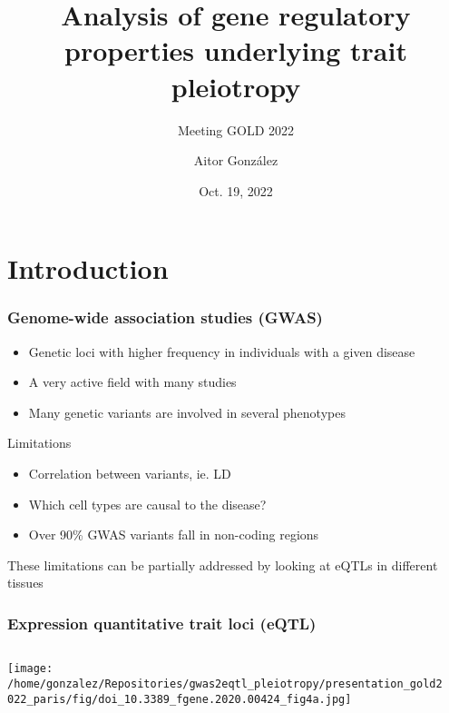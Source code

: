 \documentclass{beamer}
\title{Analysis of gene regulatory properties underlying trait pleiotropy}
\subtitle{Meeting GOLD 2022}
\author{Aitor Gonz\'alez}
\institute{Aix Marseille Univ, INSERM, TAGC}
\date{Oct. 19, 2022}
\begin{document}
\begin{frame}

\titlepage

\end{frame}


\section{Introduction} %

\begin{frame}
\frametitle{Genome-wide association studies (GWAS)}

\begin{itemize}
\item Genetic loci with higher frequency in individuals with a given disease
\item A very active field with many studies
\item Many genetic variants are involved in several phenotypes
\end{itemize}
%
\vfill
%
Limitations
%
\begin{itemize}
\item Correlation between variants, ie. LD
\item Which cell types are causal to the disease?
\item Over 90\% GWAS variants fall in non-coding regions
\end{itemize}
%
\vfill
%
These limitations can be partially addressed by looking at eQTLs in different tissues

\let\thefootnote\relax{}

\end{frame}

\begin{frame}
\frametitle{Expression quantitative trait loci (eQTL)}

\begin{columns}
\begin{column}{0.5\textwidth}
    \begin{center}
\texttt{[image: /home/gonzalez/Repositories/gwas2eqtl\_pleiotropy/presentation\_gold2022\_paris/fig/doi\_10.3389\_fgene.2020.00424\_fig4a.jpg]}
     \end{center}
\end{column}
\begin{column}{0.5\textwidth}

\end{column}
\end{columns}

\let\thefootnote\relax{}
\end{frame}
\end{document}
